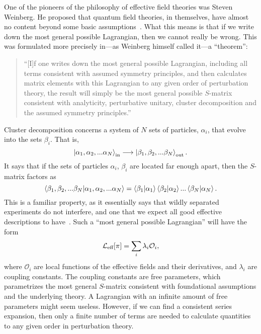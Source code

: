 One of the pioneers of the philosophy of effective field theories was Steven Weinberg.
He proposed that quantum field theories, in themselves, have almost no content beyond some basic assumptions~\autocite{weinbergDevelopmentEffectiveField2021}.
What this means is that if we write down the most general possible Lagrangian, then we cannot really be wrong.
This was formulated more precisely in---as Weinberg himself called it---a ``theorem'':
\begin{quote}
    ``[I]f one writes down the most general possible Lagrangian, including all terms consistent with assumed symmetry principles, and then calculates matrix elements with this Lagrangian to any given order of perturbation theory, the result will simply be the most general possible $S$-matrix consistent with analyticity, perturbative unitary, cluster decomposition and the assumed symmetry principles.''~\autocite{weinbergPhenomenologicalLagrangians1979}
\end{quote}

Cluster decomposition concerns a system of $N$ sets of particles, $\alpha_i$, that evolve into the sets $\beta_i$.
That is,
\begin{equation}
    \ket{\alpha_1, \alpha_2, ... \alpha_N}_\text{in}
    \longrightarrow
    \ket{\beta_1, \beta_2, ... \beta_N}_\text{out}.
\end{equation}
It says that if the sets of particles $\alpha_i$, $\beta_i$ are located far enough apart, then the $S$-matrix factors as
\begin{equation}
    {\braket{\beta_1, \beta_2, ... \beta_N|\alpha_1, \alpha_2, ... \alpha_N}}
    =
    \braket{\beta_1|\alpha_1}\braket{\beta_2|\alpha_2}... \braket{\beta_N|\alpha_N}.
\end{equation}
This is a familiar property, as it essentially says that wildly separated experiments do not interfere, and one that we expect all good effective descriptions to have~\autocite{weinbergQuantumTheoryFields1995,weinbergQuantumTheoryFields1996}.
Such a ``most general possible Lagrangian'' will have the form
\begin{equation}
    \mathcal{L}_\text{eff}[\pi] = \sum_i \lambda_i \mathcal O_i,
\end{equation}
where $\mathcal O_i$ are local functions of the effective fields and their derivatives, and $\lambda_i$ are coupling constants.
The coupling constants are free parameters, which parametrizes the most general $S$-matrix consistent with foundational assumptions and the underlying theory.
A Lagrangian with an infinite amount of free parameters might seem useless.
However, if we can find a consistent series expansion, then only a finite number of terms are needed to calculate quantities to any given order in perturbation theory.


